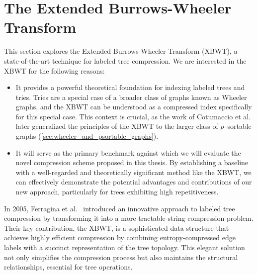 \section[The Extended Burrows-Wheeler Transform]{The Extended Burrows-Wheeler \\ Transform} \label{sec:XBWT}
This section explores the Extended Burrows-Wheeler Transform (XBWT), a state-of-the-art technique for labeled tree compression.
We are interested in the XBWT for the following reasons:
\begin{itemize}
    \item It provides a powerful theoretical foundation for indexing labeled trees and tries. Tries are a special case of a broader class of graphs known as Wheeler graphs, and the XBWT can be understood as a compressed index specifically for this special case. This context is crucial, as the work of Cotumaccio et al.~\cite{cotumaccio2021indexing} later generalized the principles of the XBWT to the larger class of $p$--sortable graphs (\cref{sec:wheeler_and_psortable_graphs}).
    \item It will serve as the primary benchmark against which we will evaluate the novel compression scheme proposed in this thesis. By establishing a baseline with a well-regarded and theoretically significant method like the XBWT, we can effectively demonstrate the potential advantages and contributions of our new approach, particularly for trees exhibiting high repetitiveness.
\end{itemize}

In 2005, Ferragina et al.~\cite{ferragina2009compressing} introduced an innovative approach to labeled tree compression by transforming it into a more tractable string compression problem. Their key contribution, the XBWT, is a sophisticated data structure that achieves highly efficient compression by combining entropy-compressed edge labels with a succinct representation of the tree topology. This elegant solution not only simplifies the compression process but also maintains the structural relationships, essential for tree operations.

